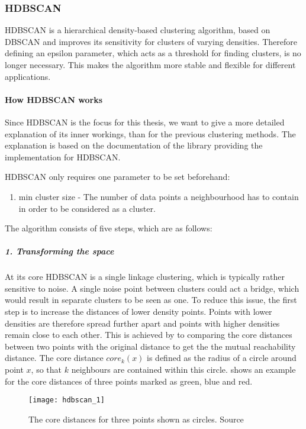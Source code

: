 \subsubsection{HDBSCAN}
\label{subsubsec:3_hdbscan}

HDBSCAN is a hierarchical density-based clustering algorithm\cite{McInnes2017},
based on DBSCAN and improves its sensitivity for clusters of varying densities.
Therefore defining an epsilon parameter, which acts as a threshold for finding clusters, is no longer necessary.
This makes the algorithm more stable and flexible for different applications.

\paragraph{How HDBSCAN works}
Since HDBSCAN is the focus for this thesis, we want to give a more detailed explanation of its inner workings,
than for the previous clustering methods. 
The explanation is based on the documentation of the library providing the implementation for HDBSCAN\cite{how_hdbscan_works}.

HDBSCAN only requires one parameter to be set beforehand:

\begin{enumerate}
    \item min cluster size - The number of data points a neighbourhood has to contain in order to be considered as a cluster.
\end{enumerate}

The algorithm consists of five steps, which are as follows: 

\subparagraph{1. Transforming the space}
At its core HDBSCAN is a single linkage clustering, which is typically rather sensitive to noise.
A single noise point between clusters could act a bridge, which would result in separate clusters to be seen as one.
To reduce this issue, the first step is to increase the distances of lower density points. 
Points with lower densities are therefore spread further apart and points with higher densities remain close to each other.
This is achieved by to comparing the core distances between two points with the original distance
to get the the mutual reachability distance.
The core distance $core_k(x)$ is defined as the radius of a circle around point $x$,
so that $k$ neighbours are contained within this circle.
 shows an example for the core distances of three points marked as green, blue and red.

\begin{figure}[h]
    \centering
    \texttt{[image: hdbscan\_1]}
    \caption{
        The core distances for three points shown as circles.
        Source\cite{how_hdbscan_works}
    }
    \label{fig:hdbscan_1}
\end{figure}

